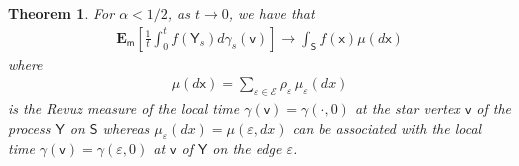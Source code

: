 \documentclass[[11pt,a4paper,reqno]{article}
\newtheorem{theorem}{Theorem}[section]
\numberwithin{equation}{section}
\begin{document}
\begin{theorem}
For $\alpha < 1/2$, as $t\to 0$, we have that 
\begin{align}
\mathbf{E}_{\mathsf{m}} \left[ \frac{1}{t} \int_0^t f(\mathsf{Y}_s) d\gamma_s(\mathsf{v}) \right] \to \int_{\mathsf{S}} f(\mathsf{x}) \mu(d\mathsf{x})
\label{RevMeasure}
\end{align}
where
\begin{align*}
\mu(d\mathsf{x}) = \sum_{\varepsilon \in \mathcal{E}}  \rho_\varepsilon\, \mu_\varepsilon(dx)
\end{align*}
is the Revuz measure of the local time $\gamma(\mathsf{v}) = \gamma(\cdot, 0)$ at the star vertex $\mathsf{v}$ of the process $\mathsf{Y}$ on $\mathsf{S}$ whereas $\mu_\varepsilon(dx) = \mu(\varepsilon, dx)$ can be associated with the local time $\gamma(\mathsf{v}) = \gamma(\varepsilon, 0)$ at $\mathsf{v}$ of $\mathsf{Y}$ on the edge $\varepsilon$.
\end{theorem}
\end{document}
